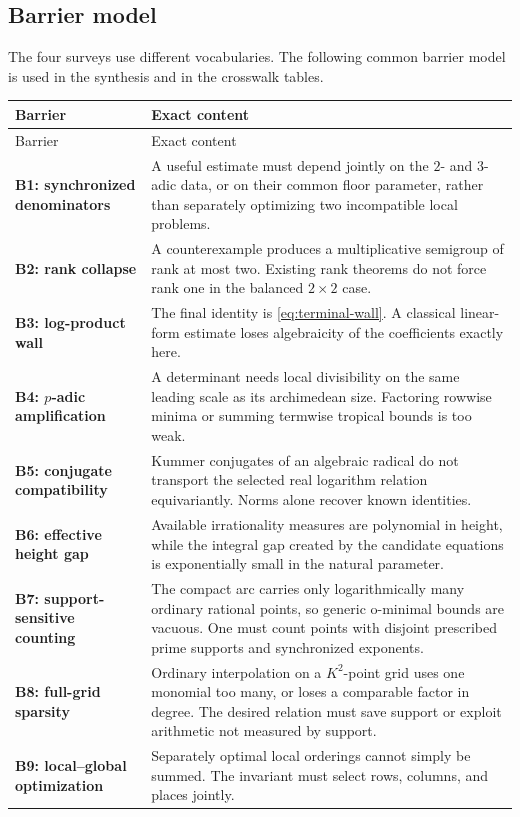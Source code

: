 \documentclass[10pt,letterpaper]{article}
\begin{document}
\subsection{Barrier model}

The four surveys use different vocabularies.  The following common barrier model is used in
the synthesis and in the crosswalk tables.

\begingroup
\small
\setlength{\LTleft}{0pt}
\setlength{\LTright}{0pt}
\begin{longtable}{@{}L{0.12\textwidth}L{0.82\textwidth}@{}}
\toprule
Barrier & Exact content\\
\midrule
\endfirsthead
\toprule
Barrier & Exact content\\
\midrule
\endhead
\bottomrule
\endfoot
\textbf{B1: synchronized denominators} & A useful estimate must depend jointly on the
\(2\)- and \(3\)-adic data, or on their common floor parameter, rather than separately
optimizing two incompatible local problems.\\
\addlinespace
\textbf{B2: rank collapse} & A counterexample produces a multiplicative semigroup of rank at
most two.  Existing rank theorems do not force rank one in the balanced \(2\times2\) case.\\
\addlinespace
\textbf{B3: log-product wall} & The final identity is \cref{eq:terminal-wall}.  A classical
linear-form estimate loses algebraicity of the coefficients exactly here.\\
\addlinespace
\textbf{B4: \(p\)-adic amplification} & A determinant needs local divisibility on the same
leading scale as its archimedean size.  Factoring rowwise minima or summing termwise tropical
bounds is too weak.\\
\addlinespace
\textbf{B5: conjugate compatibility} & Kummer conjugates of an algebraic radical do not
transport the selected real logarithm relation equivariantly.  Norms alone recover known
identities.\\
\addlinespace
\textbf{B6: effective height gap} & Available irrationality measures are polynomial in
height, while the integral gap created by the candidate equations is exponentially small in
the natural parameter.\\
\addlinespace
\textbf{B7: support-sensitive counting} & The compact arc carries only logarithmically many
ordinary rational points, so generic o-minimal bounds are vacuous.  One must count points
with disjoint prescribed prime supports and synchronized exponents.\\
\addlinespace
\textbf{B8: full-grid sparsity} & Ordinary interpolation on a \(K^2\)-point grid uses one
monomial too many, or loses a comparable factor in degree.  The desired relation must save
support or exploit arithmetic not measured by support.\\
\addlinespace
\textbf{B9: local--global optimization} & Separately optimal local orderings cannot simply be
summed.  The invariant must select rows, columns, and places jointly.\\
\end{longtable}
\endgroup
\end{document}
